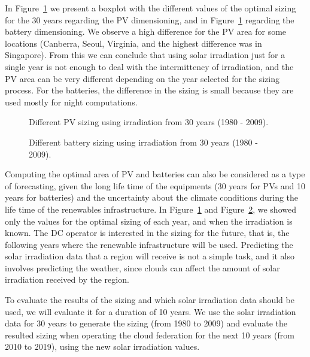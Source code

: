 In Figure~\ref{fig:pv_boxplots} we present a boxplot with the different values of the optimal sizing for the 30 years regarding the PV dimensioning, and in Figure~\ref{fig:pv_boxplots} regarding the battery dimensioning. We observe a high difference for the PV area for some locations (Canberra, Seoul, Virginia, and the highest difference was in Singapore). From this we can conclude that using solar irradiation just for a single year is not enough to deal with the intermittency of irradiation, and the PV area can be very different depending on the year selected for the sizing process. For the batteries, the difference in the sizing is small because they are used mostly for night computations.


\begin{figure}[H]
  \centering
  {}
  \caption{Different PV sizing using irradiation from 30 years (1980 - 2009).}
  \label{fig:pv_boxplots}
\end{figure}


\begin{figure}[H]
  \centering
  {}
  \caption{Different battery sizing using irradiation from 30 years (1980 - 2009).}
  \label{fig:bat_boxplots}
\end{figure}


Computing the optimal area of PV and batteries can also be considered as a type of forecasting, given the long life time of the equipments (30 years for PVs and 10 years for batteries) and the uncertainty about the climate conditions during the life time of the renewables infrastructure. In Figure~\ref{fig:pv_boxplots} and Figure~\ref{fig:bat_boxplots}, we showed only the values for the optimal sizing of each year, and when the irradiation is known. The DC operator is interested in the sizing for the future, that is, the following years where the renewable infrastructure will be used. Predicting the solar irradiation data that a region will receive is not a simple task, and it also involves predicting the weather, since clouds can affect the amount of solar irradiation received by the region. 

To evaluate the results of the sizing and which solar irradiation data should be used, we will evaluate it for a duration of 10 years. 
We use the solar irradiation data for 30 years to generate the sizing (from 1980 to 2009) and evaluate the resulted sizing when operating the cloud federation for the next 10 years (from 2010 to 2019), using the new solar irradiation values.


